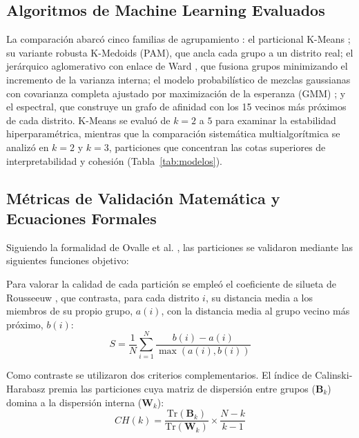 \documentclass[conference,10pt,letterpaper]{IEEEtran}
\begin{document}
\subsection{Algoritmos de Machine Learning Evaluados}

La comparación abarcó cinco familias de agrupamiento \cite{rokach2005}: el particional K-Means \cite{hartigan1979}; su variante robusta K-Medoids (PAM), que ancla cada grupo a un distrito real; el jerárquico aglomerativo con enlace de Ward \cite{ward1963}, que fusiona grupos minimizando el incremento de la varianza interna; el modelo probabilístico de mezclas gaussianas con covarianza completa ajustado por maximización de la esperanza (GMM) \cite{dempster1977}; y el espectral, que construye un grafo de afinidad con los 15 vecinos más próximos de cada distrito. K-Means se evaluó de $k = 2$ a $5$ para examinar la estabilidad hiperparamétrica, mientras que la comparación sistemática multialgorítmica se analizó en $k = 2$ y $k = 3$, particiones que concentran las cotas superiores de interpretabilidad y cohesión (Tabla~\ref{tab:modelos}).

\subsection{Métricas de Validación Matemática y Ecuaciones Formales}

Siguiendo la formalidad de Ovalle et al. \cite{ovalle2024}, las particiones se validaron mediante las siguientes funciones objetivo:

Para valorar la calidad de cada partición se empleó el coeficiente de silueta de Rousseeuw \cite{rousseeuw1987}, que contrasta, para cada distrito $i$, su distancia media a los miembros de su propio grupo, $a(i)$, con la distancia media al grupo vecino más próximo, $b(i)$:
\begin{equation}
S = \frac{1}{N} \sum_{i=1}^{N} \frac{b(i) - a(i)}{\max(a(i), b(i))}
\label{eq:silhouette}
\end{equation}

Como contraste se utilizaron dos criterios complementarios. El índice de Calinski-Harabasz \cite{calinski1974} premia las particiones cuya matriz de dispersión entre grupos ($\mathbf{B}_k$) domina a la dispersión interna ($\mathbf{W}_k$):
\begin{equation}
CH(k) = \frac{\mathrm{Tr}(\mathbf{B}_k)}{\mathrm{Tr}(\mathbf{W}_k)} \times \frac{N - k}{k - 1}
\label{eq:ch}
\end{equation}
\end{document}

